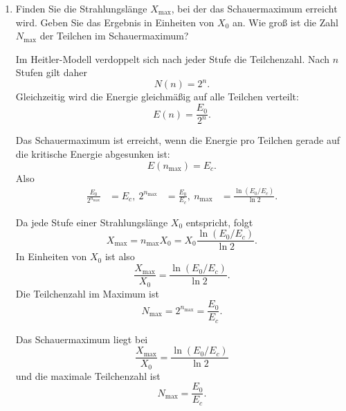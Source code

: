 \documentclass[11pt,a4paper]{scrartcl}
\begin{document}
\begin{enumerate}[label=(\alph*)]
        \item
            Finden Sie die Strahlungslänge $X_{\max}$, bei der das Schauermaximum erreicht
            wird. Geben Sie das Ergebnis in Einheiten von $X_0$ an. Wie groß ist die Zahl
            $N_{\max}$ der Teilchen im Schauermaximum?

            \begin{calculationbox}
                Im Heitler-Modell verdoppelt sich nach jeder Stufe die Teilchenzahl. Nach $n$
                Stufen gilt daher
                \[
                    N(n)=2^n.
                \]
                Gleichzeitig wird die Energie gleichmäßig auf alle Teilchen verteilt:
                \[
                    E(n)=\frac{E_0}{2^n}.
                \]

                \begin{calculationbox}
                    Das Schauermaximum ist erreicht, wenn die Energie pro Teilchen gerade auf
                    die kritische Energie abgesunken ist:
                    \[
                        E(n_{\max})=E_c.
                    \]
                    Also
                    \begin{align*}
                        \frac{E_0}{2^{n_{\max}}}&=E_c,\
                        2^{n_{\max}}&=\frac{E_0}{E_c},\
                        n_{\max}&=\frac{\ln(E_0/E_c)}{\ln 2}.
                    \end{align*}
                \end{calculationbox}

                \begin{calculationbox}
                    Da jede Stufe einer Strahlungslänge $X_0$ entspricht, folgt
                    \[
                        X_{\max}=n_{\max}X_0
                        =X_0\frac{\ln(E_0/E_c)}{\ln 2}.
                    \]
                    In Einheiten von $X_0$ ist also
                    \[
                        \frac{X_{\max}}{X_0}=\frac{\ln(E_0/E_c)}{\ln 2}.
                    \]
                    Die Teilchenzahl im Maximum ist
                    \[
                        N_{\max}=2^{n_{\max}}=\frac{E_0}{E_c}.
                    \]
                \end{calculationbox}
            \end{calculationbox}

            \begin{answerbox}
                Das Schauermaximum liegt bei
                \[
                    \boxed{\frac{X_{\max}}{X_0}=\frac{\ln(E_0/E_c)}{\ln 2}}
                \]
                und die maximale Teilchenzahl ist
                \[
                    \boxed{N_{\max}=\frac{E_0}{E_c}.}
                \]
            \end{answerbox}


\end{enumerate}
\end{document}

